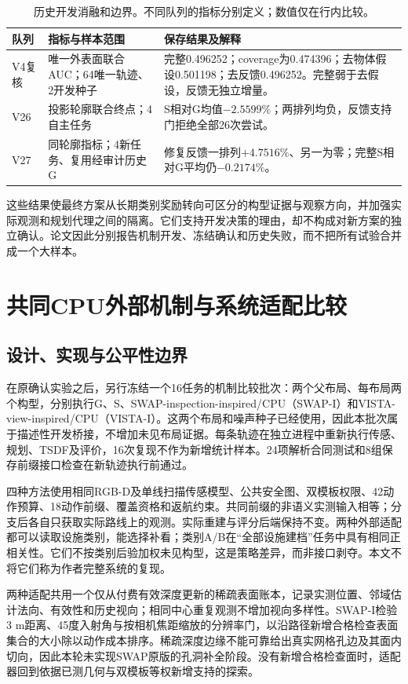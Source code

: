 \documentclass[11pt,a4paper]{article}
\begin{document}
\begin{table}[tb]
\centering\small
\caption{历史开发消融和边界。不同队列的指标分别定义；数值仅在行内比较。}
\label{tab:negative}
\begin{tabular}{p{.13\linewidth}p{.26\linewidth}p{.49\linewidth}}
\toprule
队列 & 指标与样本范围 & 保存结果及解释\\\midrule
V4复核 & 唯一外表面联合AUC；64唯一轨迹、2开发种子 & 完整0.496252；coverage为0.474396；去物体假设0.501198；去反馈0.496252。完整弱于去假设，反馈无独立增量。\\
V26 & 投影轮廓联合终点；4自主任务 & S相对G均值$-2.5599\%$；两排列均负，反馈支持门拒绝全部26次尝试。\\
V27 & 同轮廓指标；4新任务、复用经审计历史G & 修复反馈一排列$+4.7516\%$、另一为零；完整S相对G平均仍$-0.2174\%$。\\\bottomrule
\end{tabular}
\end{table}

这些结果使最终方案从长期类别奖励转向可区分的构型证据与观察方向，并加强实际观测和规划代理之间的隔离。它们支持开发决策的理由，却不构成对新方案的独立确认。论文因此分别报告机制开发、冻结确认和历史失败，而不把所有试验合并成一个大样本。

\section{共同CPU外部机制与系统适配比较}
\label{sec:external}
\subsection{设计、实现与公平性边界}
在原确认实验之后，另行冻结一个16任务的机制比较批次：两个父布局、每布局两个构型，分别执行G、S、SWAP-inspection-inspired/CPU（SWAP-I）和VISTA-view-inspired/CPU（VISTA-I）。这两个布局和噪声种子已经使用，因此本批次属于描述性开发桥接，不增加未见布局证据。每条轨迹在独立进程中重新执行传感、规划、TSDF及评价，16次复现不作为新增统计样本。24项解析合同测试和8组保存前缀接口检查在新轨迹执行前通过。

四种方法使用相同RGB-D及单线扫描传感模型、公共安全图、双模板权限、42动作预算、18动作前缀、覆盖资格和返航约束。共同前缀的非语义实测输入相等；分支后各自只获取实际路线上的观测。实际重建与评分后端保持不变。两种外部适配都可以读取设施类别，能选择补看；类别A/B在“全部设施建档”任务中具有相同正相关性。它们不按类别后验加权未见构型，这是策略差异，而非接口剥夺。本文不将它们称为作者完整系统的复现。

两种适配共用一个仅从付费有效深度更新的稀疏表面账本，记录实测位置、邻域估计法向、有效性和历史视向；相同中心重复观测不增加视向多样性。SWAP-I检验3 m距离、45度入射角与按相机焦距缩放的分辨率门，以沿路径新增合格检查表面集合的大小除以动作成本排序。稀疏深度边缘不能可靠给出真实网格孔边及其面内切向，因此本轮未实现SWAP原版的孔洞补全阶段。没有新增合格检查面时，适配器回到依据已测几何与双模板等权新增支持的探索。
\end{document}
